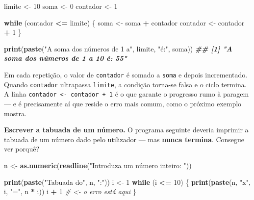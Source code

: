 \documentclass[
  portuguese,
  11pt,
  openany]{book}
\newenvironment{Shaded}{\begin{snugshade}}{\end{snugshade}}
\newcommand{\CommentTok}[1]{\textcolor[rgb]{0.56,0.35,0.01}{\textit{#1}}}
\newcommand{\ControlFlowTok}[1]{\textcolor[rgb]{0.13,0.29,0.53}{\textbf{#1}}}
\newcommand{\DecValTok}[1]{\textcolor[rgb]{0.00,0.00,0.81}{#1}}
\newcommand{\DocumentationTok}[1]{\textcolor[rgb]{0.56,0.35,0.01}{\textbf{\textit{#1}}}}
\newcommand{\FunctionTok}[1]{\textcolor[rgb]{0.13,0.29,0.53}{\textbf{#1}}}
\newcommand{\NormalTok}[1]{#1}
\newcommand{\OtherTok}[1]{\textcolor[rgb]{0.56,0.35,0.01}{#1}}
\newcommand{\SpecialCharTok}[1]{\textcolor[rgb]{0.81,0.36,0.00}{\textbf{#1}}}
\newcommand{\StringTok}[1]{\textcolor[rgb]{0.31,0.60,0.02}{#1}}
\begin{document}
\begin{Shaded}
\begin{Highlighting}[]
\NormalTok{limite }\OtherTok{\textless{}{-}} \DecValTok{10}
\NormalTok{soma }\OtherTok{\textless{}{-}} \DecValTok{0}
\NormalTok{contador }\OtherTok{\textless{}{-}} \DecValTok{1}

\ControlFlowTok{while}\NormalTok{ (contador }\SpecialCharTok{\textless{}=}\NormalTok{ limite) \{}
\NormalTok{  soma }\OtherTok{\textless{}{-}}\NormalTok{ soma }\SpecialCharTok{+}\NormalTok{ contador}
\NormalTok{  contador }\OtherTok{\textless{}{-}}\NormalTok{ contador }\SpecialCharTok{+} \DecValTok{1}
\NormalTok{\}}

\FunctionTok{print}\NormalTok{(}\FunctionTok{paste}\NormalTok{(}\StringTok{"A soma dos números de 1 a"}\NormalTok{, limite, }\StringTok{"é:"}\NormalTok{, soma))}
\DocumentationTok{\#\# [1] "A soma dos números de 1 a 10 é: 55"}
\end{Highlighting}
\end{Shaded}

Em cada repetição, o valor de \texttt{contador} é somado a \texttt{soma} e depois incrementado.
Quando \texttt{contador} ultrapassa \texttt{limite}, a condição torna-se falsa e o ciclo termina. A
linha \texttt{contador\ \textless{}-\ contador\ +\ 1} é o que garante o progresso rumo à paragem --- e é
precisamente aí que reside o erro mais comum, como o próximo exemplo mostra.

\textbf{Escrever a tabuada de um número.} O programa seguinte deveria imprimir a tabuada
de um número dado pelo utilizador --- mas \textbf{nunca termina}. Consegue ver porquê?

\begin{Shaded}
\begin{Highlighting}[]
\NormalTok{n }\OtherTok{\textless{}{-}} \FunctionTok{as.numeric}\NormalTok{(}\FunctionTok{readline}\NormalTok{(}\StringTok{"Introduza um número inteiro: "}\NormalTok{))}

\FunctionTok{print}\NormalTok{(}\FunctionTok{paste}\NormalTok{(}\StringTok{"Tabuada do"}\NormalTok{, n, }\StringTok{":"}\NormalTok{))}
\NormalTok{i }\OtherTok{\textless{}{-}} \DecValTok{1}
\ControlFlowTok{while}\NormalTok{ (i }\SpecialCharTok{\textless{}=} \DecValTok{10}\NormalTok{) \{}
  \FunctionTok{print}\NormalTok{(}\FunctionTok{paste}\NormalTok{(n, }\StringTok{"x"}\NormalTok{, i, }\StringTok{"="}\NormalTok{, n }\SpecialCharTok{*}\NormalTok{ i))}
\NormalTok{  i }\SpecialCharTok{+} \DecValTok{1}          \CommentTok{\# \textless{}{-} o erro está aqui}
\NormalTok{\}}
\end{Highlighting}
\end{Shaded}
\end{document}
